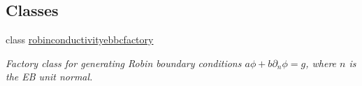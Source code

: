 \subsection*{Classes}
\begin{DoxyCompactItemize}
\item 
class \hyperlink{classrobinconductivityebbcfactory}{robinconductivityebbcfactory}
\begin{DoxyCompactList}\small\item\em Factory class for generating Robin boundary conditions $a\phi + b\partial_n\phi = g$, where $n$ is the EB unit normal. \end{DoxyCompactList}\end{DoxyCompactItemize}

